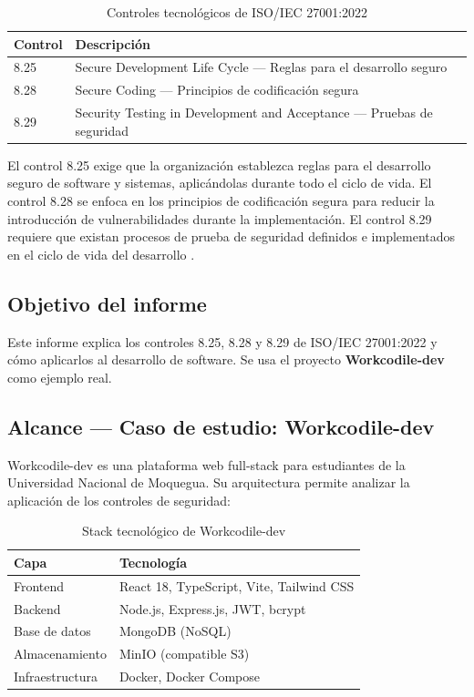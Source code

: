 \begin{table}[h]
\centering
\small
\begin{tabular}{|l|p{5.5cm}|}
\hline
\textbf{Control} & \textbf{Descripción} \\
\hline
8.25 & Secure Development Life Cycle --- Reglas para el desarrollo seguro \\
\hline
8.28 & Secure Coding --- Principios de codificación segura \\
\hline
8.29 & Security Testing in Development and Acceptance --- Pruebas de seguridad \\
\hline
\end{tabular}
\caption{Controles tecnológicos de ISO/IEC 27001:2022}
\label{tab:controles-8}
\end{table}

El control 8.25 exige que la organización establezca reglas para el desarrollo seguro de software y sistemas, aplicándolas durante todo el ciclo de vida. El control 8.28 se enfoca en los principios de codificación segura para reducir la introducción de vulnerabilidades durante la implementación. El control 8.29 requiere que existan procesos de prueba de seguridad definidos e implementados en el ciclo de vida del desarrollo \cite{nist800218}.

\subsection{Objetivo del informe}

Este informe explica los controles 8.25, 8.28 y 8.29 de ISO/IEC 27001:2022 y cómo aplicarlos al desarrollo de software. Se usa el proyecto \textbf{Workcodile-dev} como ejemplo real.

\subsection{Alcance --- Caso de estudio: Workcodile-dev}

Workcodile-dev es una plataforma web full-stack para estudiantes de la Universidad Nacional de Moquegua. Su arquitectura permite analizar la aplicación de los controles de seguridad:

\begin{table}[h]
\centering
\begin{tabular}{|l|l|}
\hline
\textbf{Capa} & \textbf{Tecnología} \\
\hline
Frontend & React 18, TypeScript, Vite, Tailwind CSS \\
Backend & Node.js, Express.js, JWT, bcrypt \\
Base de datos & MongoDB (NoSQL) \\
Almacenamiento & MinIO (compatible S3) \\
Infraestructura & Docker, Docker Compose \\
\hline
\end{tabular}
\caption{Stack tecnológico de Workcodile-dev}
\label{tab:stack-intro}
\end{table}


